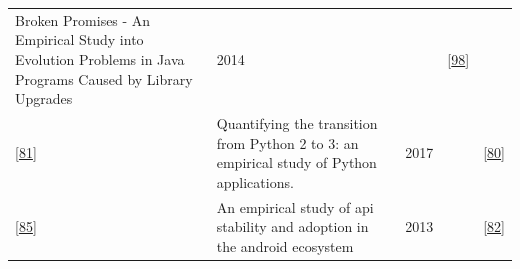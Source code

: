 \documentclass[]{book}
\begin{document}
\begin{longtable}[]{@{}lllll@{}}
\begin{minipage}[t]{0.31\columnwidth}
Broken Promises - An Empirical Study into Evolution Problems in Java
Programs Caused by Library Upgrades\strut
\end{minipage} & \begin{minipage}[t]{0.02\columnwidth}\raggedright\strut
2014\strut
\end{minipage} & \begin{minipage}[t]{0.24\columnwidth}\raggedright\strut
\strut
\end{minipage} & \begin{minipage}[t]{0.16\columnwidth}\raggedright\strut
{[}\protect\hyperlink{ref-Raemaekers2017}{98}{]}\strut
\end{minipage}\tabularnewline
\begin{minipage}[t]{0.12\columnwidth}\raggedright\strut
{[}\protect\hyperlink{ref-Malloy2017}{81}{]}\strut
\end{minipage} & \begin{minipage}[t]{0.31\columnwidth}\raggedright\strut
Quantifying the transition from Python 2 to 3: an empirical study of
Python applications.\strut
\end{minipage} & \begin{minipage}[t]{0.02\columnwidth}\raggedright\strut
2017\strut
\end{minipage} & \begin{minipage}[t]{0.24\columnwidth}\raggedright\strut
\strut
\end{minipage} & \begin{minipage}[t]{0.16\columnwidth}\raggedright\strut
{[}\protect\hyperlink{ref-Malloy2018}{80}{]}\strut
\end{minipage}\tabularnewline
\begin{minipage}[t]{0.12\columnwidth}\raggedright\strut
{[}\protect\hyperlink{ref-McDonnell2013}{85}{]}\strut
\end{minipage} & \begin{minipage}[t]{0.31\columnwidth}\raggedright\strut
An empirical study of api stability and adoption in the android
ecosystem\strut
\end{minipage} & \begin{minipage}[t]{0.02\columnwidth}\raggedright\strut
2013\strut
\end{minipage} & \begin{minipage}[t]{0.24\columnwidth}\raggedright\strut
\strut
\end{minipage} & \begin{minipage}[t]{0.16\columnwidth}\raggedright\strut
{[}\protect\hyperlink{ref-Manikas2016}{82}{]}\strut
\end{minipage}\tabularnewline
\bottomrule
\end{longtable}
\end{document}
